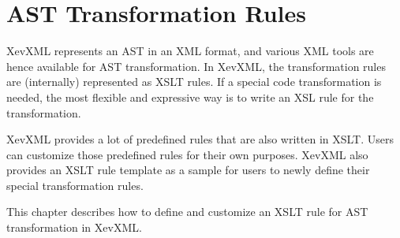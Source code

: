 \chapter{AST Transformation Rules}

XevXML represents an AST in an XML format, and various XML tools are
hence available for AST transformation. In XevXML, the transformation
rules are (internally) represented as XSLT rules. If a special code
transformation is needed, the most flexible and expressive way is to
write an XSL rule for the transformation.

XevXML provides a lot of predefined rules that are also written in XSLT.
Users can customize those predefined rules for their own
purposes. XevXML also provides an XSLT rule template as a sample for
users to newly define their special transformation rules.

This chapter describes how to define and customize an XSLT rule for AST
transformation in XevXML.

